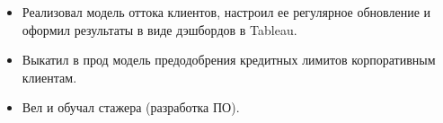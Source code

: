 \begin{itemize}
    \item Реализовал модель оттока клиентов, настроил ее регулярное обновление и оформил результаты в виде дэшбордов в Tableau.
    \item Выкатил в прод модель предодобрения кредитных лимитов корпоративным клиентам.
    \item Вел и обучал стажера (разработка ПО).
\end{itemize}

